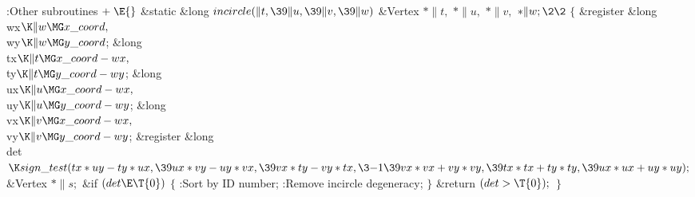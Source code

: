 \Y\B\4:Other subroutines\X${}\mathrel+\E{}$\6
\1\1\&{static} \&{long} ${}\\{incircle}(\|t,\39\|u,\39\|v,\39\|w){}$\6
\&{Vertex} ${}{*}\|t,{}$ ${}{*}\|u,{}$ ${}{*}\|v,{}$ ${}{*}\|w;\2\2{}$\6
${}\{{}$\5
\1\&{register} \&{long} \\{wx}${}\K\|w\MG\\{x\_coord},{}$ \\{wy}${}\K\|w\MG\\{y%
\_coord}{}$;\6
\&{long} \\{tx}${}\K\|t\MG\\{x\_coord}-\\{wx},{}$ \\{ty}${}\K\|t\MG\\{y%
\_coord}-\\{wy}{}$;\6
\&{long} \\{ux}${}\K\|u\MG\\{x\_coord}-\\{wx},{}$ \\{uy}${}\K\|u\MG\\{y%
\_coord}-\\{wy}{}$;\6
\&{long} \\{vx}${}\K\|v\MG\\{x\_coord}-\\{wx},{}$ \\{vy}${}\K\|v\MG\\{y%
\_coord}-\\{wy}{}$;\6
\&{register} \&{long} \\{det}${}\K\\{sign\_test}(\\{tx}*\\{uy}-\\{ty}*\\{ux},%
\39\\{ux}*\\{vy}-\\{uy}*\\{vx},\39\\{vx}*\\{ty}-\\{vy}*\\{tx},\3{-1}\39\\{vx}*%
\\{vx}+\\{vy}*\\{vy},\39\\{tx}*\\{tx}+\\{ty}*\\{ty},\39\\{ux}*\\{ux}+\\{uy}*%
\\{uy});{}$\6
\&{Vertex} ${}{*}\|s;{}$\7
\&{if} ${}(\\{det}\E\T{0}){}$\5
${}\{{}$\1\6
:Sort  by ID number\X;\6
:Remove incircle degeneracy\X;\6
\4${}\}{}$\2\6
\&{return} ${}(\\{det}>\T{0});{}$\6
\4${}\}{}$\2\par
\fi

